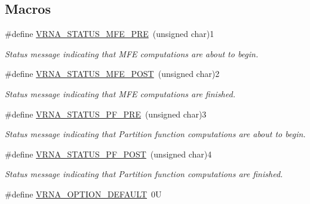 \subsection*{Macros}
\begin{DoxyCompactItemize}
\item 
\#define \hyperlink{group__fold__compound_ga1a5053dc8acbb0111e852988726f07d6}{V\+R\+N\+A\+\_\+\+S\+T\+A\+T\+U\+S\+\_\+\+M\+F\+E\+\_\+\+P\+RE}~(unsigned char)1
\begin{DoxyCompactList}\small\item\em Status message indicating that M\+FE computations are about to begin. \end{DoxyCompactList}\item 
\#define \hyperlink{group__fold__compound_ga47c900ca76e56e59e2e83a06e0bde641}{V\+R\+N\+A\+\_\+\+S\+T\+A\+T\+U\+S\+\_\+\+M\+F\+E\+\_\+\+P\+O\+ST}~(unsigned char)2
\begin{DoxyCompactList}\small\item\em Status message indicating that M\+FE computations are finished. \end{DoxyCompactList}\item 
\#define \hyperlink{group__fold__compound_ga91795d35ebdb6f32be50459f24b3d114}{V\+R\+N\+A\+\_\+\+S\+T\+A\+T\+U\+S\+\_\+\+P\+F\+\_\+\+P\+RE}~(unsigned char)3
\begin{DoxyCompactList}\small\item\em Status message indicating that Partition function computations are about to begin. \end{DoxyCompactList}\item 
\#define \hyperlink{group__fold__compound_ga1c6fa243533fd026e50f7d595eaaa565}{V\+R\+N\+A\+\_\+\+S\+T\+A\+T\+U\+S\+\_\+\+P\+F\+\_\+\+P\+O\+ST}~(unsigned char)4
\begin{DoxyCompactList}\small\item\em Status message indicating that Partition function computations are finished. \end{DoxyCompactList}\item 
\#define \hyperlink{group__fold__compound_gacea5b7ee6181c485f36e2afa0e9089e4}{V\+R\+N\+A\+\_\+\+O\+P\+T\+I\+O\+N\+\_\+\+D\+E\+F\+A\+U\+LT}~0U\hypertarget{group__fold__compound_gacea5b7ee6181c485f36e2afa0e9089e4}{}\label{group__fold__compound_gacea5b7ee6181c485f36e2afa0e9089e4}


\end{DoxyCompactItemize}
